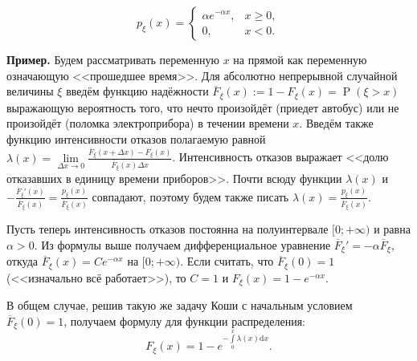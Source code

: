 \documentclass[12pt]{article}
\numberwithin{theorem}{section}
\theoremstyle{definition}
\newenvironment{example}{\indent \textbf{Пример.}}{\indent}
\newcommand{\defin}[2]{\hypertarget{#2}{{\color{red} #1}}}
\newcommand{\prob}{\operatorname{P}}
\newcommand{\diff}{\mathrm{d}}
\begin{document}
	\begin{center}
		\begin{minipage}{0.45\textwidth}
			\[
			p_\xi(x) =
			\begin{cases}
				\alpha e^{-\alpha x}, & x \geqslant 0, \\
				0, & x < 0.
			\end{cases}
			\]
		\end{minipage}
		\begin{minipage}{0.5\textwidth}
		\end{minipage}
	\end{center}
	
	\begin{example}
		Будем рассматривать переменную $ x $ на прямой как переменную означающую <<прошедшее время>>.
		Для абсолютно непрерывной случайной величины $ \xi $ введём 
		\defin{функцию надёжности}{reliability-function} $ \overline{F}_\xi(x) := 1 - F_\xi(x) = \prob(\xi > x) $
		выражающую вероятность того, что нечто произойдёт (приедет автобус) или не произойдёт (поломка электроприбора)
		в течении времени $ x $. Введём также функцию \defin{интенсивности отказов}{failure-rate}
		полагаемую равной $ \lambda(x) = 
		\lim\limits_{\Delta x \to 0} \tfrac{\overline{F}_\xi(x + \Delta x) - \overline{F}_\xi(x)}{\overline{F}_\xi(x)\Delta x} $.
		Интенсивность отказов выражает <<долю отказавших в единицу времени приборов>>.
		Почти всюду функции $ \lambda(x) $ и 
		$ - \tfrac{\overline{F}_\xi'(x)}{\overline{F}_\xi(x)} = \tfrac{p_\xi(x)}{\overline{F}_\xi(x)} $
		совпадают, поэтому будем также писать $ \lambda(x) = \tfrac{p_\xi(x)}{\overline{F}_\xi(x)} $.
		
		Пусть теперь интенсивность отказов постоянна на полуинтервале $ [0;+\infty) $ и равна $ \alpha > 0 $.
		Из формулы выше получаем дифференциальное уравнение $ \overline{F}_\xi' = -\alpha\overline{F}_\xi $,
		откуда $ \overline{F}_\xi(x) = Ce^{-\alpha x} $ на $ [0;+\infty) $. 
		Если считать, что $ \overline{F}_\xi(0) = 1 $ (<<изначально всё работает>>), 
		то  $ C = 1 $ и $ F_\xi(x) = 1 - e^{-\alpha x} $.
		
		В общем случае, решив такую же задачу Коши с начальным условием $ \overline{F}_\xi(0) = 1 $,
		получаем формулу для функции распределения:
		$$ F_\xi(x) = 1 - e^{-\int\limits_{0}^{x} \lambda(x)\diff x}. $$
	\end{example}
	
\end{document}
